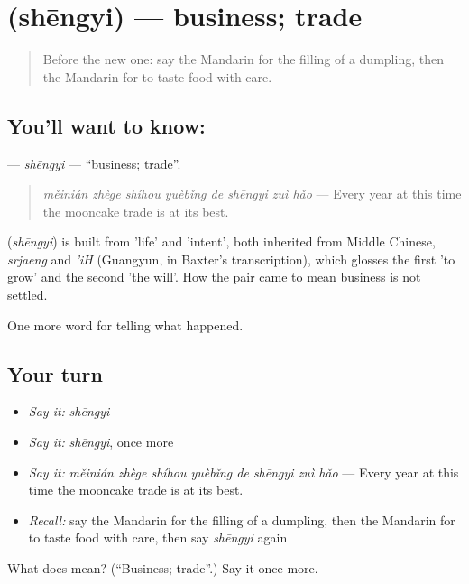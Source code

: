 \section[\texorpdfstring{\zh{生意} (shēngyi)}{生意 (shēngyi)}]{ (shēngyi) — business; trade}

\label{lesson:ZH-C341-shengyi}



\begin{quote}
Before the new one: say the Mandarin for the filling of a dumpling, then the Mandarin for to taste food with care.
\end{quote}

\subsection*{You'll want to know: }
\textbf{} — \emph{shēngyi} — \textquotedblleft{}business; trade\textquotedblright{}.

\begin{quote}
\textbf{} \emph{měinián zhège shíhou yuèbǐng de shēngyi zuì hǎo} — Every year at this time the mooncake trade is at its best.
\end{quote}

\begin{cousinweb}
\textbf{} (\emph{shēngyi}) is built from  'life' and  'intent', both inherited from Middle Chinese, \emph{srjaeng} and \emph{'iH} (Guangyun, in Baxter's transcription), which glosses the first 'to grow' and the second 'the will'. How the pair came to mean business is not settled.
\end{cousinweb}

\begin{grammarlens}[title={What you've built}]
One more word for telling what happened.
\end{grammarlens}

\subsection*{Your turn}
\begin{itemize}
\raggedright
  \item \emph{Say it:} \emph{shēngyi}
  \item \emph{Say it:} \emph{shēngyi}, once more
  \item \emph{Say it:} \emph{měinián zhège shíhou yuèbǐng de shēngyi zuì hǎo} — Every year at this time the mooncake trade is at its best.
  \item \emph{Recall:} say the Mandarin for the filling of a dumpling, then the Mandarin for to taste food with care, then say \emph{shēngyi} again
\end{itemize}

\begin{tcolorbox}[breakable,colback=teal!4,colframe=teal!35!black,title={Before you move on}]
What does  mean? (\textquotedblleft{}Business; trade\textquotedblright{}.) Say it once more.
\end{tcolorbox}
